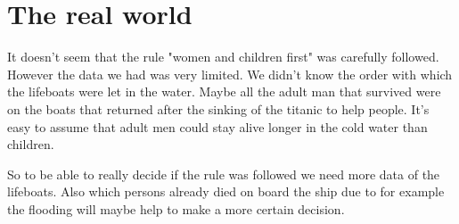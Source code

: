 \documentclass[a4]{article}
\begin{document}
\section{The real world}
It doesn't seem that the rule "women and children first" was carefully followed. However the data we had was very limited. We didn't know the order with which the lifeboats were let in the water. Maybe all the adult man that survived were on the boats that returned after the sinking of the titanic to help people. It's easy to assume that adult men could stay alive longer in the cold water than children.\par
So to be able to really decide if the rule was followed we need more data of the lifeboats. Also which persons already died on board the ship due to for example the flooding will maybe help to make a more certain decision.
\printbibliography
\end{document}
